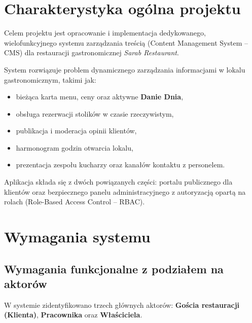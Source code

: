 \documentclass[12pt,a4paper]{article}
\begin{document}
\tableofcontents
\newpage

\section{Charakterystyka ogólna projektu}
Celem projektu jest opracowanie i implementacja dedykowanego, wielofunkcyjnego systemu zarządzania treścią (Content Management System – CMS) dla restauracji gastronomicznej \textit{Sarab Restaurant}. 

System rozwiązuje problem dynamicznego zarządzania informacjami w lokalu gastronomicznym, takimi jak:
\begin{itemize}
    \item bieżąca karta menu, ceny oraz aktywne \textbf{Danie Dnia},
    \item obsługa rezerwacji stolików w czasie rzeczywistym,
    \item publikacja i moderacja opinii klientów,
    \item harmonogram godzin otwarcia lokalu,
    \item prezentacja zespołu kucharzy oraz kanałów kontaktu z personelem.
\end{itemize}

Aplikacja składa się z dwóch powiązanych części: portalu publicznego dla klientów oraz bezpiecznego panelu administracyjnego z autoryzacją opartą na rolach (Role-Based Access Control – RBAC).

\section{Wymagania systemu}

\subsection{Wymagania funkcjonalne z podziałem na aktorów}

W systemie zidentyfikowano trzech głównych aktorów: \textbf{Gościa restauracji (Klienta)}, \textbf{Pracownika} oraz \textbf{Właściciela}.
\end{document}

